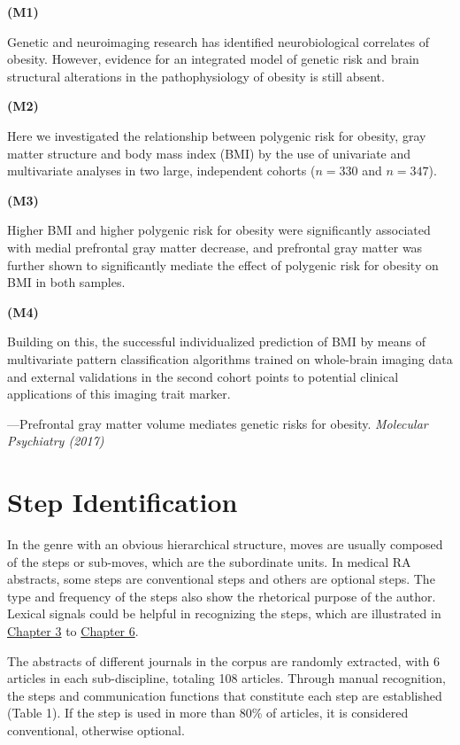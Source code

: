 \documentclass{ctexbook}
\begin{document}
\begin{sample}[label={myautocounter}]{\heiti}
\textbf{(M1)}

Genetic and neuroimaging research has identified neurobiological correlates of obesity. However, evidence for an integrated model of genetic risk and brain structural alterations in the pathophysiology of obesity is still absent.

\textbf{(M2)}

Here we investigated the relationship between polygenic risk for obesity, gray matter structure and body mass index (BMI) by the use of univariate and multivariate analyses in two large, independent cohorts ($n=330$ and $n=347$).

\textbf{(M3)}

Higher BMI and higher polygenic risk for obesity were significantly associated with medial prefrontal gray matter decrease, and prefrontal gray matter was further shown to significantly mediate the effect of polygenic risk for obesity on BMI in both samples.

\textbf{(M4)}

Building on this, the successful individualized prediction of BMI by means of multivariate pattern classification algorithms trained on whole-brain imaging data and external validations in the second cohort points to potential clinical applications of this imaging trait marker.

\begin{flushright}
  ---Prefrontal gray matter volume mediates genetic risks for obesity. \emph{Molecular Psychiatry (2017)}
\end{flushright}

\end{sample}

\section{Step Identification}

In the genre with an obvious hierarchical structure, moves are usually composed of the steps or sub-moves, which are the subordinate units. In medical RA abstracts, some steps are conventional steps and others are optional steps. The type and frequency of the steps also show the rhetorical purpose of the author. Lexical signals could be helpful in recognizing the steps, which are illustrated in \hyperref[chapter3]{Chapter 3} to \hyperref[chapter6]{Chapter 6}.

The abstracts of different journals in the corpus are randomly extracted, with 6 articles in each sub-discipline, totaling 108 articles. Through manual recognition, the steps and communication functions that constitute each step are established (Table 1). If the step is used in more than 80\% of articles, it is considered conventional, otherwise optional.
\end{document}
